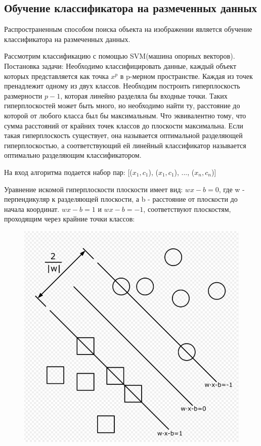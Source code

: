 \newpage
\subsection{Обучение классификатора на размеченных данных}
Распространенным способом поиска объекта на изображении является обучение классификатора на размеченных данных.

Рассмотрим классификацию с помощью SVM(машина опорных векторов)\cite{b:SVM}.
Постановка задачи: \newline
Необходимо классифицировать данные, каждый объект которых представляется как точка $x^p$ в p-мерном пространстве. Каждая из точек пренадлежит одному из двух классов. Необходим построить гиперплоскость размерности $p-1$, которая линейно разделяла бы входные точки. 
Таких гиперплоскостей может быть много, но необходимо найти ту, расстояние до которой от любого класса был бы максимальным. Что эквивалентно тому, что сумма расстояний от крайних точек классов до плоскости максимальна. 
Если такая гиперплоскость существует, она называется оптимальной разделяющей гиперплоскостью, а соответствующий ей линейный классификатор называется оптимально разделяющим классификатором.

\newpage
На вход алгоритма подается набор пар: [($x_1, c_1$), ($x_1, c_1$), ..., ($x_n, c_n$)]

Уравнение искомой гиперплоскости плоскости имеет вид:
$wx - b = 0$, где w - перпендикуляр к разделяющей плоскости, а b - расстояние от плоскости до начала координат.\newline
$wx - b = 1$ и $wx - b = -1$, соответствуют плоскостям, проходящим через крайние точки классов:
\begin{figure}[!h]
	\centering
	\includegraphics[width=0.5\linewidth,height=0.5\linewidth]{pictures/screenshot021}
	\caption{}
	\label{fig:screenshot021}
\end{figure}

